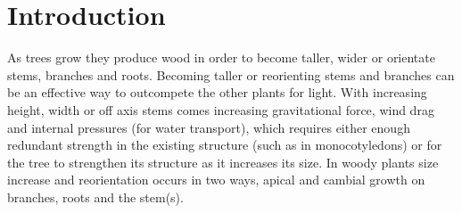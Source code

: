 \chapter{Introduction}
As trees grow they produce wood in order to become taller, wider or orientate
stems, branches and roots. Becoming taller or reorienting stems and branches can
be an effective way to outcompete the other plants for light.
With increasing height, width or off axis stems comes increasing gravitational
force, wind drag and internal pressures (for water transport), which requires
either enough redundant strength in the existing structure (such as in
monocotyledons) or for the tree to strengthen its structure as it increases its
size. In woody plants size increase and reorientation occurs in
two ways, apical and cambial growth on branches, roots and the stem(s).